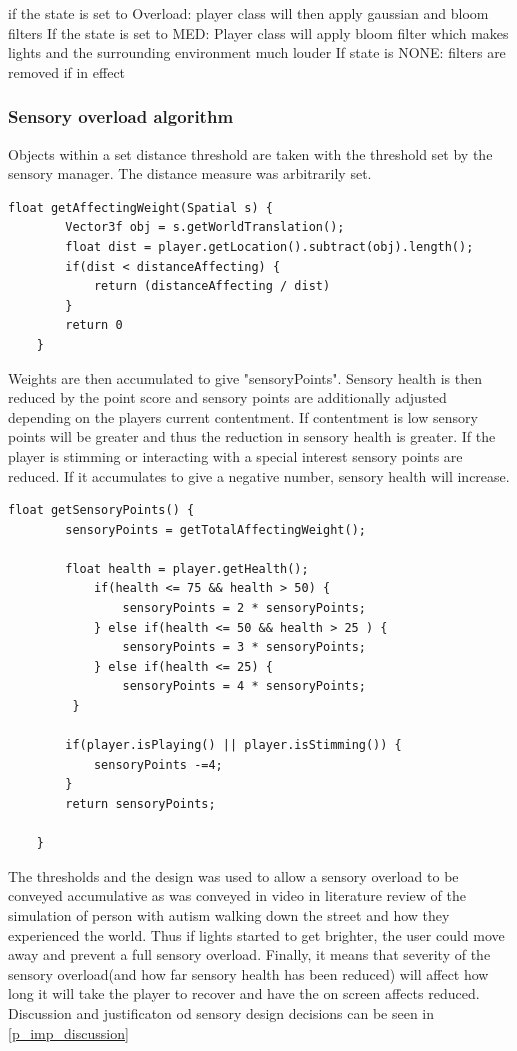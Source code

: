\documentclass[11pt]{report}
\begin{document}
if the state is set to Overload: player class will then apply gaussian and bloom filters
If the state is set to MED: Player class will apply bloom filter which makes lights and the surrounding environment much louder
If state is NONE: filters are removed if in effect


\subsubsection{Sensory overload algorithm}
\label{sec:prototypesensoryoverloadalgorithm}
Objects within a set distance threshold are taken with the threshold set by the sensory manager. The distance measure was arbitrarily set.

\begin{lstlisting}
float getAffectingWeight(Spatial s) {
        Vector3f obj = s.getWorldTranslation();
        float dist = player.getLocation().subtract(obj).length();
        if(dist < distanceAffecting) {
            return (distanceAffecting / dist)
        }       
        return 0
    }
\end{lstlisting}

Weights are then accumulated to give "sensoryPoints". Sensory health is then reduced by the point score and sensory points are additionally adjusted depending on the players current contentment. If contentment is low sensory points will be greater and thus the reduction in sensory health is greater. If the player is stimming or interacting with a special interest sensory points are reduced. If it accumulates to give a negative number, sensory health will increase.

\begin{lstlisting}
float getSensoryPoints() {       
        sensoryPoints = getTotalAffectingWeight();
        
        float health = player.getHealth();
            if(health <= 75 && health > 50) {
                sensoryPoints = 2 * sensoryPoints;
            } else if(health <= 50 && health > 25 ) {
                sensoryPoints = 3 * sensoryPoints;
            } else if(health <= 25) {
                sensoryPoints = 4 * sensoryPoints;
         }
        
        if(player.isPlaying() || player.isStimming()) {
            sensoryPoints -=4;
        }       
        return sensoryPoints;
        
    }
\end{lstlisting}

The thresholds and the design was used to allow a sensory overload to be conveyed accumulative as was conveyed in video in literature review of the simulation of person with autism walking down the street and how they experienced the world. Thus if lights started to get brighter, the user could move away and prevent a full sensory overload. Finally, it means that severity of the sensory overload(and how far sensory health has been reduced) will affect how long it will take the player to recover and have the on screen affects reduced. Discussion and justificaton od sensory design decisions can be seen in \ref{p_imp_discussion}
\end{document}
